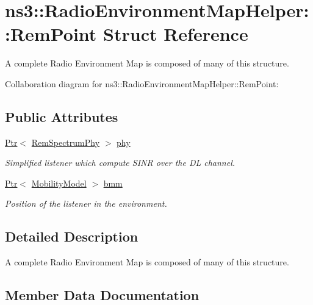 \hypertarget{structns3_1_1RadioEnvironmentMapHelper_1_1RemPoint}{}\section{ns3\+:\+:Radio\+Environment\+Map\+Helper\+:\+:Rem\+Point Struct Reference}
\label{structns3_1_1RadioEnvironmentMapHelper_1_1RemPoint}


A complete Radio Environment Map is composed of many of this structure.  




Collaboration diagram for ns3\+:\+:Radio\+Environment\+Map\+Helper\+:\+:Rem\+Point\+:
\subsection*{Public Attributes}
\begin{DoxyCompactItemize}
\item 
\hyperlink{classns3_1_1Ptr}{Ptr}$<$ \hyperlink{classns3_1_1RemSpectrumPhy}{Rem\+Spectrum\+Phy} $>$ \hyperlink{structns3_1_1RadioEnvironmentMapHelper_1_1RemPoint_a2408da1d47adc2dd4831ff94fd08b002}{phy}
\begin{DoxyCompactList}\small\item\em Simplified listener which compute S\+I\+NR over the DL channel. \end{DoxyCompactList}\item 
\hyperlink{classns3_1_1Ptr}{Ptr}$<$ \hyperlink{classns3_1_1MobilityModel}{Mobility\+Model} $>$ \hyperlink{structns3_1_1RadioEnvironmentMapHelper_1_1RemPoint_ab5ec56ca2ff5f1641dfcbe12028668c9}{bmm}
\begin{DoxyCompactList}\small\item\em Position of the listener in the environment. \end{DoxyCompactList}\end{DoxyCompactItemize}


\subsection{Detailed Description}
A complete Radio Environment Map is composed of many of this structure. 

\subsection{Member Data Documentation}
